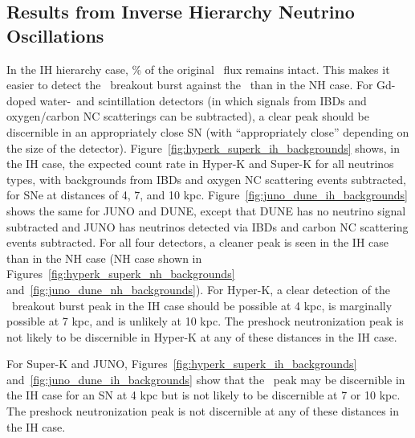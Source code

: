 \subsection{Results from Inverse Hierarchy Neutrino Oscillations}
In the IH hierarchy case, \% of the original \nue\ flux remains
intact.  This makes it easier to detect the \nue\ breakout burst
against the \backgrounds\ than in the NH case.  For
Gd-doped water-\cer\ and scintillation detectors (in which signals from
IBDs and oxygen/carbon NC scatterings can be subtracted), a clear peak
should be discernible in an appropriately close SN (with
``appropriately close'' depending on the size of the detector).  
Figure~\ref{fig:hyperk_superk_ih_backgrounds}
shows, in the IH case, the expected count rate in Hyper-K and Super-K 
for all neutrinos types, with
backgrounds from IBDs and oxygen NC scattering events subtracted, for
SNe at distances of 4, 7, and 10 kpc.  
Figure~\ref{fig:juno_dune_ih_backgrounds} shows the same for JUNO and
DUNE, except that DUNE has no neutrino signal subtracted and JUNO has
neutrinos detected via IBDs and carbon NC scattering events subtracted.
For all four detectors, a
cleaner peak is seen in the IH case than in the NH case (NH case shown
in Figures~\ref{fig:hyperk_superk_nh_backgrounds} and~\ref{fig:juno_dune_nh_backgrounds}).  For Hyper-K, 
a clear detection of
the \nue\ breakout burst peak in the IH case 
should be possible at 4 kpc, is
marginally possible at 7 kpc, and is unlikely at 10 kpc. The
preshock neutronization peak is not likely to be discernible in
Hyper-K at
any of these distances in the IH case.

For Super-K and JUNO,
Figures~\ref{fig:hyperk_superk_ih_backgrounds} and~\ref{fig:juno_dune_ih_backgrounds} show that
the \nue\ peak may be discernible in the IH case for an SN at 4
kpc but is not likely to be discernible at 7 or 10 kpc.  The preshock
neutronization peak is not discernible at any of these
distances in the IH case.


